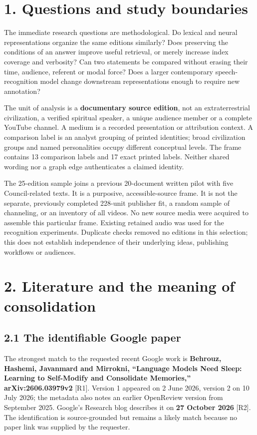 \documentclass[
  10pt,
]{article}
\begin{document}
\section{1. Questions and study
boundaries}\label{questions-and-study-boundaries}

The immediate research questions are methodological. Do lexical and
neural representations organize the same editions similarly? Does
preserving the conditions of an answer improve useful retrieval, or
merely increase index coverage and verbosity? Can two statements be
compared without erasing their time, audience, referent or modal force?
Does a larger contemporary speech-recognition model change downstream
representations enough to require new annotation?

The unit of analysis is a \textbf{documentary source edition}, not an
extraterrestrial civilization, a verified spiritual speaker, a unique
audience member or a complete YouTube channel. A medium is a recorded
presentation or attribution context. A comparison label is an analyst
grouping of printed identities; broad civilization groups and named
personalities occupy different conceptual levels. The frame contains 13
comparison labels and 17 exact printed labels. Neither shared wording
nor a graph edge authenticates a claimed identity.

The 25-edition sample joins a previous 20-document written pilot with
five Council-related texts. It is a purposive, accessible-source frame.
It is not the separate, previously completed 228-unit publisher fit, a
random sample of channeling, or an inventory of all videos. No new
source media were acquired to assemble this particular frame. Existing
retained audio was used for the recognition experiments. Duplicate
checks removed no editions in this selection; this does not establish
independence of their underlying ideas, publishing workflows or
audiences.

\section{2. Literature and the meaning of
consolidation}\label{literature-and-the-meaning-of-consolidation}

\subsection{2.1 The identifiable Google
paper}\label{the-identifiable-google-paper}

The strongest match to the requested recent Google work is
\textbf{Behrouz, Hashemi, Javanmard and Mirrokni, ``Language Models Need
Sleep: Learning to Self-Modify and Consolidate Memories,''
arXiv:2606.03979v2} {[}R1{]}. Version 1 appeared on 2 June 2026, version
2 on 10 July 2026; the metadata also notes an earlier OpenReview version
from September 2025. Google's Research blog describes it on \textbf{27
October 2026} {[}R2{]}. The identification is source-grounded but
remains a likely match because no paper link was supplied by the
requester.
\end{document}
